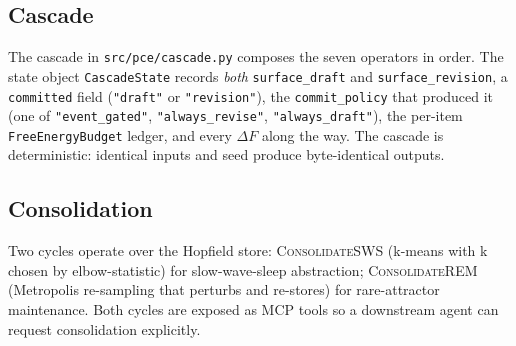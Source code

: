 \subsection{Cascade}
The cascade in \texttt{src/pce/cascade.py} composes the seven operators in order. The state object \texttt{CascadeState} records \emph{both} \texttt{surface\_draft} and \texttt{surface\_revision}, a \texttt{committed} field (\texttt{"draft"} or \texttt{"revision"}), the \texttt{commit\_policy} that produced it (one of \texttt{"event\_gated"}, \texttt{"always\_revise"}, \texttt{"always\_draft"}), the per-item \texttt{FreeEnergyBudget} ledger, and every $\Delta F$ along the way. The cascade is deterministic: identical inputs and seed produce byte-identical outputs.

\subsection{Consolidation}
Two cycles operate over the Hopfield store: \textsc{ConsolidateSWS} (k-means with k chosen by elbow-statistic) for slow-wave-sleep abstraction; \textsc{ConsolidateREM} (Metropolis re-sampling that perturbs and re-stores) for rare-attractor maintenance. Both cycles are exposed as MCP tools so a downstream agent can request consolidation explicitly.
